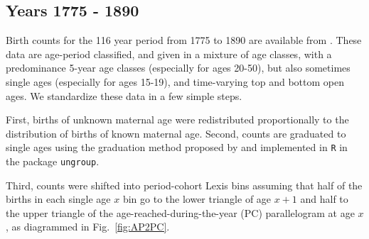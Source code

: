 \documentclass{article}
\begin{document}
\begin{appendix}
\subsection{Years 1775 - 1890}
Birth counts for the 116 year period from 1775 to 1890 are available from \citet{sgf1907}. These data are age-period classified, and given in a mixture of age classes, with a
predominance 5-year age classes (especially for ages 20-50), but also sometimes
single ages (especially for ages 15-19), and time-varying top and bottom open
ages. We standardize these data in a few simple steps.

First, births of unknown maternal age were redistributed proportionally to the distribution of births of known maternal age. Second, counts are graduated to single ages using the graduation method proposed by \citet{rizzi2015efficient} and implemented in \texttt{R} in the package \texttt{ungroup}. 


Third, counts were shifted into period-cohort Lexis bins assuming that half of the births in each single age $x$ bin go to the lower triangle of age $x+1$ and half to the upper triangle of the age-reached-during-the-year (PC) parallelogram at age $x$, as diagrammed in Fig.~\ref{fig:AP2PC}.


\end{appendix}
\end{document}
